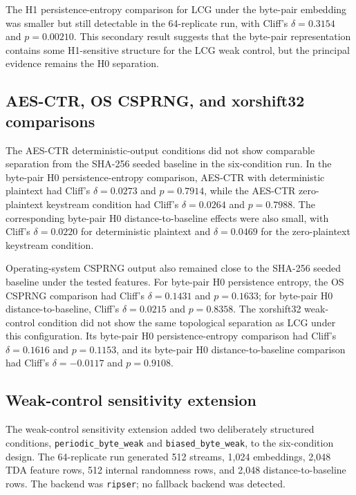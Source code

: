 

The H1 persistence-entropy comparison for LCG under the byte-pair embedding was smaller but still detectable in the 64-replicate run, with Cliff's $\delta = 0.3154$ and $p = 0.00210$. This secondary result suggests that the byte-pair representation contains some H1-sensitive structure for the LCG weak control, but the principal evidence remains the H0 separation.

\subsection{AES-CTR, OS CSPRNG, and xorshift32 comparisons}
\label{subsec:primary-non-lcg-comparisons}

The AES-CTR deterministic-output conditions did not show comparable separation from the SHA-256 seeded baseline in the six-condition run. In the byte-pair H0 persistence-entropy comparison, AES-CTR with deterministic plaintext had Cliff's $\delta = 0.0273$ and $p = 0.7914$, while the AES-CTR zero-plaintext keystream condition had Cliff's $\delta = 0.0264$ and $p = 0.7988$. The corresponding byte-pair H0 distance-to-baseline effects were also small, with Cliff's $\delta = 0.0220$ for deterministic plaintext and $\delta = 0.0469$ for the zero-plaintext keystream condition.

Operating-system CSPRNG output also remained close to the SHA-256 seeded baseline under the tested features. For byte-pair H0 persistence entropy, the OS CSPRNG comparison had Cliff's $\delta = 0.1431$ and $p = 0.1633$; for byte-pair H0 distance-to-baseline, Cliff's $\delta = 0.0215$ and $p = 0.8358$. The xorshift32 weak-control condition did not show the same topological separation as LCG under this configuration. Its byte-pair H0 persistence-entropy comparison had Cliff's $\delta = 0.1616$ and $p = 0.1153$, and its byte-pair H0 distance-to-baseline comparison had Cliff's $\delta = -0.0117$ and $p = 0.9108$.

\subsection{Weak-control sensitivity extension}
\label{subsec:weak-control-sensitivity-results}

The weak-control sensitivity extension added two deliberately structured conditions, \texttt{periodic\_byte\_weak} and \texttt{biased\_byte\_weak}, to the six-condition design. The 64-replicate run generated 512 streams, 1,024 embeddings, 2,048 TDA feature rows, 512 internal randomness rows, and 2,048 distance-to-baseline rows. The backend was \texttt{ripser}; no fallback backend was detected.

